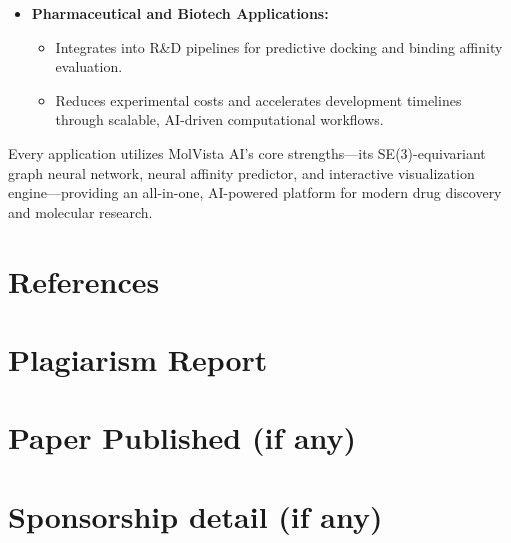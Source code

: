 \documentclass[12pt,a4]{report}
\makeatletter
\def\@makechapterhead#1{%
  \vspace*{\fill}%
  \begin{center}
    {\Huge\bfseries CHAPTER \thechapter\\[1.5ex]#1}
  \end{center}
  \thispagestyle{chaptertitle}%
  \vspace*{\fill}
  \clearpage
}
\makeatother
\begin{document}
\begin{itemize}
    \item \textbf{Pharmaceutical and Biotech Applications:}
    \begin{itemize}
        \item Integrates into R\&D pipelines for predictive docking and binding affinity evaluation.
        \item Reduces experimental costs and accelerates development timelines through scalable, AI-driven computational workflows.\\
    \end{itemize}
\end{itemize}

\vspace{0.2cm}
\hspace{0.3in}Every application utilizes MolVista AI’s core strengths—its SE(3)-equivariant graph neural network, neural affinity predictor, and interactive visualization engine—providing an all-in-one, AI-powered platform for modern drug discovery and molecular research.


\clearpage
{}
\pagestyle{empty}

\makeatletter
\renewcommand{\@chapapp}{Annexure}
\renewcommand{\thechapter}{\Alph{chapter}}
\makeatother

\makeatletter
\renewcommand{\@makechapterhead}[1]{%
  \vspace*{\fill}%
  \begin{center}
    {\Huge\bfseries Annexure \thechapter\\[1.5ex]#1}
  \end{center}
  \thispagestyle{chaptertitle}%
  \vspace*{\fill}
  \clearpage
}
\makeatother

\begin{appendices}
\chapter{References}

\chapter{Plagiarism Report }
\chapter{Paper Published (if any)}
\chapter{Sponsorship detail (if any)}
\end{appendices}
\end{document}
